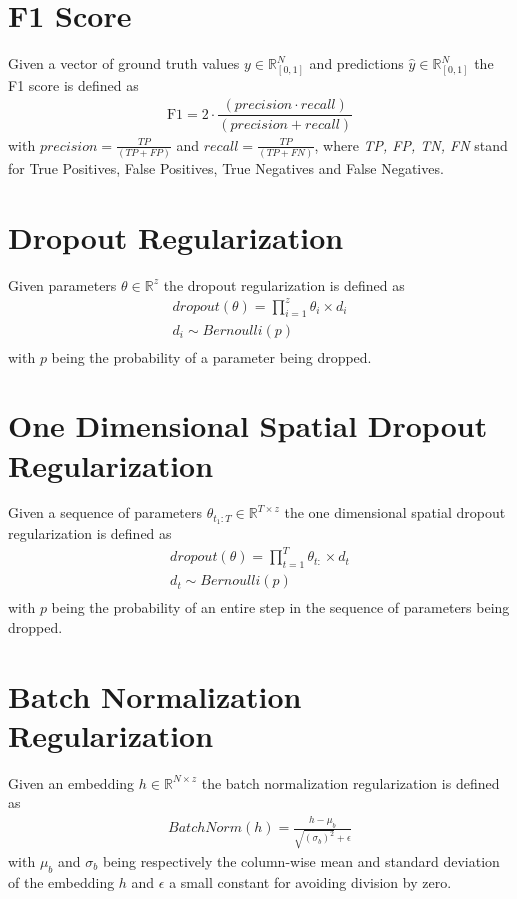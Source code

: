 \section{F1 Score}
Given a vector of ground truth values $y \in \mathbb{R}^N_{[0, 1]}$ and predictions $\widehat{y} \in \mathbb{R}^N_{[0, 1]}$ the F1 score is defined as 
\begin{gather}
\label{F1}
    \text{F1}=
        2 \cdot 
        \dfrac
            {(precision \cdot recall)}
            {(precision + recall)}
\end{gather}
with $precision =\frac {TP}{(TP + FP)}$ and $recall = \frac {TP}{(TP + FN)}$, where \textit{TP, FP, TN, FN} stand for True Positives, False Positives, True Negatives and False Negatives. 

\section{Dropout Regularization}
Given parameters $\theta \in \mathbb{R}^z$ the dropout regularization is defined as 
\begin{gather}
    \label{dropout}
    dropout(\theta) = \prod^z _{i=1} \theta_i \times d_i \\ \nonumber
    d_i \sim Bernoulli(p) \\ \nonumber
\end{gather}
with $p$ being the probability of a parameter being dropped. 

\section{One Dimensional Spatial Dropout Regularization}
Given a sequence of parameters $\theta_{t_1:T} \in \mathbb{R}^{T \times z}$ the one dimensional spatial dropout regularization is defined as 
\begin{gather}
    \label{spatial_dropout}
    dropout(\theta) = \prod^T _{t=1} \theta_{t:} \times d_t \\ \nonumber
    d_t \sim Bernoulli(p) \\ \nonumber
\end{gather}
with $p$ being the probability of an entire step in the sequence of parameters being dropped. 

\section{Batch Normalization Regularization}
Given an embedding  $h \in \mathbb{R}^{N\times z}$ the batch normalization regularization is defined as 
\begin{gather}
    \label{batch_norm}
    BatchNorm(h) = \frac{h - \mu_b}{\sqrt{(\sigma_b)^2} + \epsilon}
\end{gather}
with $\mu_b$ and $\sigma_b$ being respectively the column-wise mean and standard deviation of the embedding $h$ and $\epsilon$ a small constant for avoiding division by zero.

